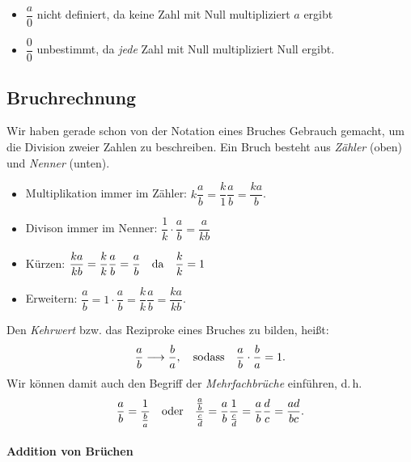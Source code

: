 \begin{itemize}
    \item $\dfrac{a}{0}$ nicht definiert, da keine Zahl mit Null multipliziert $a$ ergibt 
    \item $\dfrac{0}{0}$ unbestimmt, da \emph{jede} Zahl mit Null multipliziert Null ergibt.
\end{itemize}

\newpage
\subsection{Bruchrechnung}

Wir haben gerade schon von der Notation eines Bruches Gebrauch gemacht, um die Division zweier Zahlen zu beschreiben. Ein Bruch besteht aus \emph{Zähler} (oben) und \emph{Nenner} (unten).
\begin{itemize}
    \item Multiplikation immer im Zähler: $k \dfrac{a}{b} = \dfrac{k}{1}\dfrac{a}{b} = \dfrac{ka}{b}$. 
    \item Divison immer im Nenner: $\dfrac{1}{k}\cdot \dfrac{a}{b} = \dfrac{a}{kb}$
    \item Kürzen: $\dfrac{k a}{kb} = \dfrac{k}{k} \dfrac{a}{b} = \dfrac{a}{b} \qq{da} \dfrac{k}{k}=1$
    \item Erweitern: $\dfrac{a}{b} = 1\cdot \dfrac{a}{b} = \dfrac{k}{k}\dfrac{a}{b} = \dfrac{ka}{kb}$.
\end{itemize}
Den \emph{Kehrwert} bzw. das Reziproke eines Bruches zu bilden, heißt:
\begin{align}
    \frac{a}{b} \longrightarrow \frac{b}{a}, \qq{sodass} \frac{a}{b}\cdot\frac{b}{a} = 1.
\end{align}
Wir können damit auch den Begriff der \emph{Mehrfachbrüche} einführen, d.\,h. 
\begin{align}
    \frac{a}{b} = \frac{1}{\frac{b}{a}} \qq{oder} \frac{\frac{a}{b}}{\frac{c}{d}} = \frac{a}{b} \frac{1}{\frac{c}{d}} = \frac{a}{b}\frac{d}{c} = \frac{ad}{bc}.
\end{align}
\vspace{-11mm}

\paragraph{Addition von Brüchen}$~$

